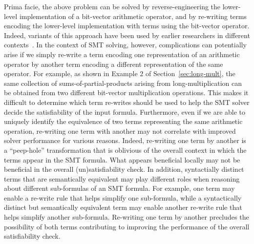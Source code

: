 Prima facie, the above problem can be solved by reverse-engineering
the lower-level implementation of a bit-vector arithmetic operator,
and by re-writing terms encoding the lower-level implementation with
terms using the bit-vector operator.  Indeed, variants of this
approach have been used by earlier researchers in different
contexts~\cite{kunz,ciesielski,kolbl,reveng,earlier-pat-match-synopsys}.
In the context of SMT solving, however, complications can potentially
arise if we simply re-write a term encoding one representation of an
arithmetic operator by another term encoding a different
representation of the same operator. For example, as shown in Example
$2$ of Section~\ref{sec:long-mult}, the same collection of
sums-of-partial-products arising from long-multiplication can be
obtained from two different bit-vector multiplication operations.
This makes it difficult to determine which term re-writes should be
used to help the SMT solver decide the satisfiability of the input
formula.  Furthermore, even if we are able to uniquely identify the
equivalence of two terms representing the same arithmetic operation,
re-writing one term with another may not correlate with improved solver
performance for various reasons.  Indeed, re-writing one term by
another is a ``peep-hole'' transformation that is oblivious of the
overall context in which the terms appear in the SMT formula.  What
appears beneficial locally may not be beneficial in the overall
(un)satisfiability check.  In addition, syntactially distinct terms
that are semantically equivalent may play different roles when
reasoning about different sub-formulas of an SMT formula.  For
example, one term may enable a re-write rule that helps simplify one
sub-formula, while a syntactically distinct but semantically
equivalent term may enable another re-write rule that helps simplify
another sub-formula. Re-writing one term by another precludes the
possibility of both terms contributing to improving the performance of
the overall satisfiability check.

